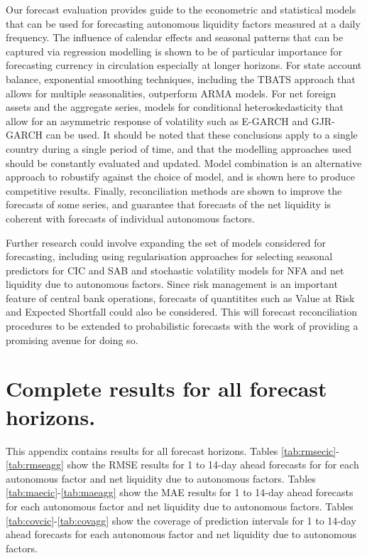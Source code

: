 \documentclass{article}
\begin{document}
Our forecast evaluation provides guide to the econometric and statistical models that can be used for forecasting autonomous liquidity factors measured at a daily frequency. The influence of calendar effects and seasonal patterns that can be captured via regression modelling is shown to be of particular importance for forecasting currency in circulation especially at longer horizons. For state account balance, exponential smoothing techniques, including the TBATS approach that allows for multiple seasonalities, outperform ARMA models. For net foreign assets and the aggregate series, models for conditional heteroskedasticity that allow for an asymmetric response of volatility such as E-GARCH and GJR-GARCH can be used. It should be noted that these conclusions apply to a single country during a single period of time, and that the modelling approaches used should be constantly evaluated and updated. Model combination is an alternative approach to robustify against the choice of model, and is shown here to produce competitive results. Finally, reconciliation methods are shown to improve the forecasts of some series, and guarantee that forecasts of the net liquidity is coherent with forecasts of individual autonomous factors.

Further research could involve expanding the set of models considered for forecasting, including using regularisation approaches for selecting seasonal predictors for CIC and SAB and stochastic volatility models for NFA and net liquidity due to autonomous factors. Since risk management is an important feature of central bank operations, forecasts of quantitites such as Value at Risk and Expected Shortfall could also be considered. This will forecast reconciliation procedures to be extended to probabilistic forecasts with the work of \citet{PanEtAl2020} providing a promising avenue for doing so.


\newpage
\printbibliography %
\newpage

\appendix
\section{Complete results for all forecast horizons.}\label{sec:appmae}
This appendix contains results for all forecast horizons. Tables \ref{tab:rmsecic}-\ref{tab:rmseagg} show the RMSE results for 1 to 14-day ahead forecasts for for each autonomous factor and net liquidity due to autonomous factors. Tables \ref{tab:maecic}-\ref{tab:maeagg} show the MAE results for 1 to 14-day ahead forecasts for each autonomous factor and net liquidity due to autonomous factors. Tables \ref{tab:covcic}-\ref{tab:covagg} show the coverage of prediction intervals for 1 to 14-day ahead forecasts for each autonomous factor and net liquidity due to autonomous factors.
\end{document}
